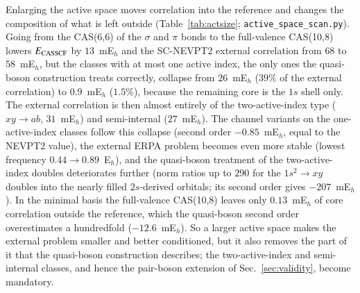 \documentclass[aip,jcp,reprint,noshowkeys,superscriptaddress]{revtex4-1}
\begin{document}
Enlarging the active space moves correlation into the reference and changes
the composition of what is left outside (Table~\ref{tab:actsize};
\texttt{active\_space\_scan.py}).  Going from the CAS(6,6) of the $\sigma$ and
$\pi$ bonds to the full-valence CAS(10,8) lowers $E_{\rm CASSCF}$ by
$13$~mE$_h$ and the SC-NEVPT2 external correlation from $68$ to $58$~mE$_h$,
but the classes with at most one active index, the only ones the quasi-boson
construction treats correctly, collapse from $26$~mE$_h$ ($39\%$ of the
external correlation) to $0.9$~mE$_h$ ($1.5\%$), because the remaining core
is the $1s$ shell only.  The external correlation is then almost entirely of
the two-active-index type ($xy\to ab$, $31$~mE$_h$) and semi-internal
($27$~mE$_h$).  The channel variants on the one-active-index classes follow
this collapse (second order $-0.85$~mE$_h$, equal to the NEVPT2 value), the
external ERPA problem becomes even more stable (lowest frequency
$0.44\to0.89$~E$_h$), and the quasi-boson treatment of the two-active-index
doubles deteriorates further (norm ratios up to $290$ for the $1s^2\to xy$
doubles into the nearly filled $2s$-derived orbitals; its second order gives
$-207$~mE$_h$).  In the minimal basis the full-valence CAS(10,8) leaves only
$0.13$~mE$_h$ of core correlation outside the reference, which the
quasi-boson second order overestimates a hundredfold ($-12.6$~mE$_h$).  So a
larger active space makes the external problem smaller and better
conditioned, but it also removes the part of it that the quasi-boson
construction describes; the two-active-index and semi-internal classes, and
hence the pair-boson extension of Sec.~\ref{sec:validity}, become mandatory.
\end{document}
